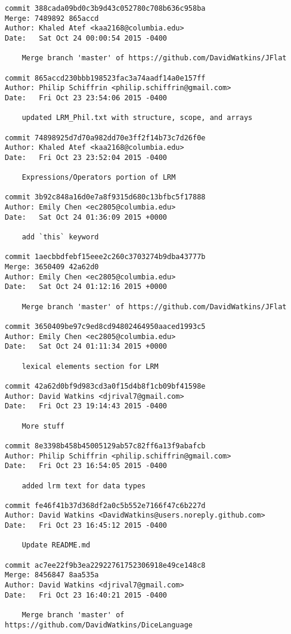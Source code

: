 \begin{verbatim}
commit 388cada09bd0c3b9d43c052780c708b636c958ba
Merge: 7489892 865accd
Author: Khaled Atef <kaa2168@columbia.edu>
Date:   Sat Oct 24 00:00:54 2015 -0400

    Merge branch 'master' of https://github.com/DavidWatkins/JFlat

commit 865accd230bbb198523fac3a74aadf14a0e157ff
Author: Philip Schiffrin <philip.schiffrin@gmail.com>
Date:   Fri Oct 23 23:54:06 2015 -0400

    updated LRM_Phil.txt with structure, scope, and arrays

commit 74898925d7d70a982dd70e3ff2f14b73c7d26f0e
Author: Khaled Atef <kaa2168@columbia.edu>
Date:   Fri Oct 23 23:52:04 2015 -0400

    Expressions/Operators portion of LRM

commit 3b92c848a16d0e7a8f9315d680c13bfbc5f17888
Author: Emily Chen <ec2805@columbia.edu>
Date:   Sat Oct 24 01:36:09 2015 +0000

    add `this` keyword

commit 1aecbbdfebf15eee2c260c3703274b9dba43777b
Merge: 3650409 42a62d0
Author: Emily Chen <ec2805@columbia.edu>
Date:   Sat Oct 24 01:12:16 2015 +0000

    Merge branch 'master' of https://github.com/DavidWatkins/JFlat

commit 3650409be97c9ed8cd94802464950aaced1993c5
Author: Emily Chen <ec2805@columbia.edu>
Date:   Sat Oct 24 01:11:34 2015 +0000

    lexical elements section for LRM

commit 42a62d0bf9d983cd3a0f15d4b8f1cb09bf41598e
Author: David Watkins <djrival7@gmail.com>
Date:   Fri Oct 23 19:14:43 2015 -0400

    More stuff

commit 8e3398b458b45005129ab57c82ff6a13f9abafcb
Author: Philip Schiffrin <philip.schiffrin@gmail.com>
Date:   Fri Oct 23 16:54:05 2015 -0400

    added lrm text for data types

commit fe46f41b37d368df2a0c5b552e7166f47c6b227d
Author: David Watkins <DavidWatkins@users.noreply.github.com>
Date:   Fri Oct 23 16:45:12 2015 -0400

    Update README.md

commit ac7ee22f9b3ea22922761752306918e49ce148c8
Merge: 8456847 8aa535a
Author: David Watkins <djrival7@gmail.com>
Date:   Fri Oct 23 16:40:21 2015 -0400

    Merge branch 'master' of https://github.com/DavidWatkins/DiceLanguage


\end{verbatim}

